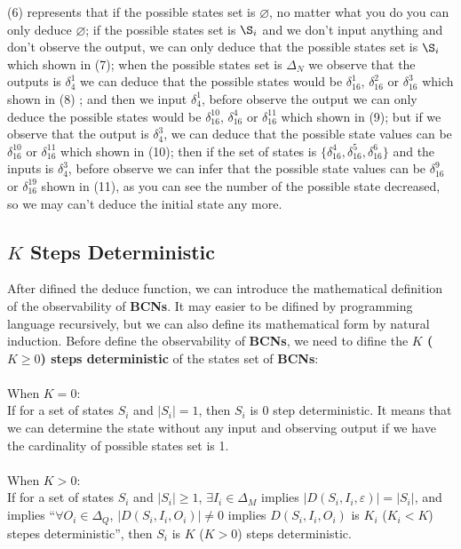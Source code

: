 \documentclass[letterpaper, 10 pt, conference]{ieeeconf}  %
\begin{document}
(6) represents that if the possible states set is $\varnothing$, no matter what you do you can only deduce $\varnothing$; if the possible states set is $\S_i$ and we don't input anything and don't observe the output, we can only deduce that the possible states set is $\S_i$ which shown in (7); when the possible states set is $\Delta_N$ we observe that the outputs is $\delta_4^1$ we can deduce that the possible states would be $\delta_{16}^1$, $\delta_{16}^2$ or  $\delta_{16}^3$ which shown in (8) ; and then we input $\delta_4^1$, before observe the output we can only deduce the possible states would be   $\delta_{16}^{10}$, $\delta_{16}^4$ or  $\delta_{16}^{11}$ which shown in (9); but if we observe that the output is $\delta_4^3$, we can deduce that the possible state values can be $\delta_{16}^{10}$ or  $\delta_{16}^{11}$ which shown in (10); then if the set of states is $\{\delta_{16}^4,\delta_{16}^5,\delta_{16}^6\}$ and the inputs is $\delta_4^3$, before observe we can infer that the possible state values can be $\delta_{16}^9$ or  $\delta_{16}^{19}$ shown in (11), as you can see the number of the possible state decreased, so we may can't deduce the initial state any more. 

\subsection{$K$ Steps Deterministic}
After difined the deduce function, we can introduce the mathematical definition of the observability of {\bf BCNs}. It may easier to be difined by programming language recursively, but we can also define its mathematical form by natural induction. Before define the observability of {\bf BCNs}, we need to difine the  {\bf  $K$ ($K\ge0$) steps deterministic} of the states set of {\bf BCNs}:\\
\\
When $K=0$:\\
 If for a set of states $S_i$ and $|S_i|=1$, then $S_i$ is $0$ step deterministic. It means that we can determine the state without any input and observing output if we have the cardinality of possible states set is 1.\\
\\
When $K>0$:\\
 If for a set of states $S_i$ and $|S_i|\ge1$, $\exists I_i \in \Delta_M$ implies $|D\left(S_i,I_i,\varepsilon\right)|=|S_i|$, and implies ``$\forall O_i\in \Delta_Q$, $|D\left(S_i,I_i,O_i\right)|\neq 0$ implies $D\left(S_i,I_i,O_i\right)$ is $K_i$ ($K_i<K$) stepes deterministic'', then $S_i$ is $K$ ($K>0$) steps deterministic.\\
\end{document}

